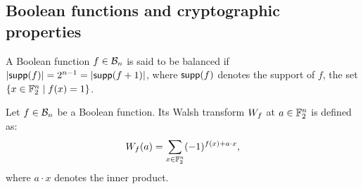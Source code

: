 \documentclass[11pt]{llncs}
\begin{document}







\subsection{Boolean functions and cryptographic properties}

\begin{definition}[Balancedness]\label{def:balancedness}
	A Boolean function $f\in \mathcal{B}_{n}$ is said to be balanced if $|\mathsf{supp}(f)|=2^{n-1}=|\mathsf{supp}(f+1)|$, where $\mathsf{supp}(f)$ denotes the support of $f$, the set $\{x\in \mathbb{F}_2^n \mid f(x)=1\}$.
\end{definition}


\begin{definition}\label{def:walsh_transform}
	Let $f\in \mathcal{B}_{n}$ be a Boolean function. Its Walsh transform $W_{f}$ at $a \in \mathbb{F}_2^n$ is defined as:
	\[  W_{f} (a) = \sum_{x \in \mathbb{F}_2^n} (-1)^{f(x) +  a \cdot x },\]
	where $a \cdot x$ denotes the inner product.
\end{definition}
\end{document}
